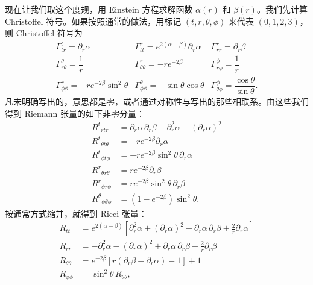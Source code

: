 现在让我们取这个度规，用 Einstein 方程求解函数 $\alpha(r)$ 和 $\beta(r)$。我们先计算 Christoffel 符号。如果按照通常的做法，用标记 $(t, r, \theta, \phi)$ 来代表 $(0, 1, 2, 3)$，则 Christoffel 符号为
\begin{equation*}
\begin{array}{lll}
\Gamma^t_{tr} = \partial_r\alpha & \Gamma^r_{tt} = e^{2(\alpha-\beta)}\partial_r\alpha & \Gamma^r_{rr} = \partial_r\beta\\[8pt]
\Gamma^\theta_{r\theta} = \dfrac{1}{r} & \Gamma^r_{\theta\theta} = -re^{-2\beta} & \Gamma^\phi_{r\phi} = \dfrac{1}{r}\\[8pt]
\Gamma^r_{\phi\phi} = -re^{-2\beta}\sin^2\theta & \Gamma^\theta_{\phi\phi} = -\sin\theta\cos\theta & \Gamma^\phi_{\theta\phi} = \dfrac{\cos\theta}{\sin\theta}.
\end{array}
\tag{5.12}
\end{equation*}
凡未明确写出的，意思都是零，或者通过对称性与写出的那些相联系。由这些我们得到 Riemann 张量的如下非零分量：
\begin{align*}
R^t{}_{rtr} &= \partial_r\alpha\,\partial_r\beta - \partial_r^2\alpha - (\partial_r\alpha)^2\\
R^t{}_{\theta t\theta} &= -re^{-2\beta}\partial_r\alpha\\
R^t{}_{\phi t\phi} &= -re^{-2\beta}\sin^2\theta\,\partial_r\alpha\\
R^r{}_{\theta r\theta} &= re^{-2\beta}\partial_r\beta\\
R^r{}_{\phi r\phi} &= re^{-2\beta}\sin^2\theta\,\partial_r\beta\\
R^\theta{}_{\phi\theta\phi} &= (1 - e^{-2\beta})\sin^2\theta.
\tag{5.13}
\end{align*}
按通常方式缩并，就得到 Ricci 张量：
\begin{align*}
R_{tt} &= e^{2(\alpha-\beta)}\left[\partial_r^2\alpha + (\partial_r\alpha)^2 - \partial_r\alpha\,\partial_r\beta + \frac{2}{r}\partial_r\alpha\right]\\
R_{rr} &= -\partial_r^2\alpha - (\partial_r\alpha)^2 + \partial_r\alpha\,\partial_r\beta + \frac{2}{r}\partial_r\beta\\
R_{\theta\theta} &= e^{-2\beta}\left[r(\partial_r\beta - \partial_r\alpha) - 1\right] + 1\\
R_{\phi\phi} &= \sin^2\theta\,R_{\theta\theta},
\tag{5.14}
\end{align*}

